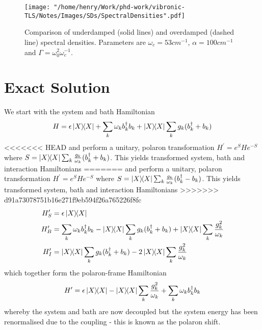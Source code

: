\documentclass[]{article}
\begin{document}
\begin{figure}
	\texttt{[image: "/home/henry/Work/phd-work/vibronic-TLS/Notes/Images/SDs/SpectralDensities".pdf]}
	\caption{Comparison of underdamped (solid lines) and overdamped (dashed line) spectral densities. Parameters are $\omega_c=53cm^{-1}$, $\alpha=100cm^{-1}$ and $\Gamma=\omega_0^2\omega_c^{-1}$.}
\end{figure}
\section{Exact Solution}
We start with the system and bath Hamiltonian
\begin{equation}
H = \epsilon\dyad{X} + \sum_{k}\omega_k b_k^{\dagger} b_k + \dyad{X}\sum_{k}g_k (b_k^{\dagger}+b_k)
\end{equation}
<<<<<<< HEAD
and perform a unitary, polaron transformation $H^{\prime} = e^{S}He^{-S}$ where $S= \dyad{X}\sum_{k}\frac{g_k}{\omega_k}(b_k^{\dagger}+b_k)$. This yields transformed system, bath and interaction Hamiltonians
=======
and perform a unitary, polaron transformation $H^{\prime} = e^{S}He^{-S}$ where $S= \dyad{X}\sum_{k}\frac{g_k}{\omega_k}(b_k^{\dagger}-b_k)$. This yields transformed system, bath and interaction Hamiltonians
>>>>>>> d91a73078751b16e271f9eb594f26a765226f8fc
\begin{align}
H_S^{\prime} &= \epsilon\dyad{X} \\
H_B^{\prime} &= \sum_{k}\omega_k b_k^{\dagger}b_k - \dyad{X}\sum_{k}g_k (b_k^{\dagger}+b_k) +\dyad{X}\sum_{k}\frac{g^2_k}{\omega_k} \\
H_I^{\prime} &= \dyad{X}\sum_{k}g_k (b_k^{\dagger}+b_k) - 2\dyad{X}\sum_{k}\frac{g^2_k}{\omega_k} \\
\end{align}
which together form the polaron-frame Hamiltonian
\begin{equation}
H^{\prime} = \epsilon\dyad{X} - \dyad{X}\sum_{k}\frac{g^2_k}{\omega_k} + \sum_{k}\omega_k b_k^{\dagger}b_k
\end{equation}
whereby the system and bath are now decoupled but the system energy has been renormalised due to the coupling - this is known as the polaron shift.
\end{document}
